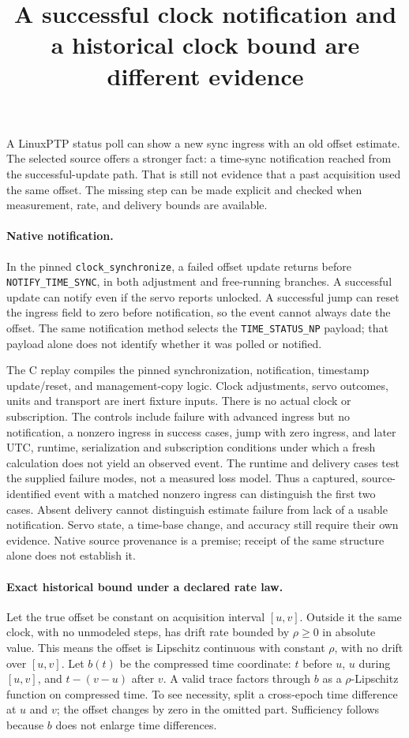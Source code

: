 \documentclass[11pt]{article}
\title{A successful clock notification and a historical clock bound are different evidence}
\begin{document}
\maketitle

A LinuxPTP status poll can show a new sync ingress with an old
offset estimate. The selected source offers a stronger fact:
a time-sync notification reached from the successful-update path.
That is still not evidence that a past acquisition used the same
offset. The missing step can be made explicit and checked when
measurement, rate, and delivery bounds are available.

\paragraph{Native notification.}
In the pinned \texttt{clock\_synchronize}, a failed offset update
returns before \texttt{NOTIFY\_TIME\_SYNC}, in both adjustment
and free-running branches. A successful update can notify even
if the servo reports unlocked. A successful jump can reset the
ingress field to zero before notification, so the event cannot
always date the offset. The same notification method selects
the \texttt{TIME\_STATUS\_NP} payload; that payload alone does
not identify whether it was polled or notified.

The C replay compiles the pinned synchronization, notification,
timestamp update/reset, and management-copy logic. Clock adjustments,
servo outcomes, units and transport are inert fixture inputs.
There is no actual clock or subscription. The controls include
failure with advanced ingress but no notification, a nonzero
ingress in success cases, jump with zero ingress, and later UTC,
runtime, serialization and subscription conditions under which
a fresh calculation does not yield an observed event. The
runtime and delivery cases test the supplied failure modes, not
a measured loss model. Thus a captured, source-identified event
with a matched nonzero ingress can distinguish the first two
cases. Absent delivery cannot distinguish estimate failure from
lack of a usable notification. Servo state, a time-base change,
and accuracy still require their own evidence. Native source
provenance is a premise; receipt of the same structure alone
does not establish it.

\paragraph{Exact historical bound under a declared rate law.}
Let the true offset be constant on acquisition interval \([u,v]\).
Outside it the same clock, with no unmodeled steps, has drift rate
bounded by \(\rho\ge0\) in absolute value. This means the offset
is Lipschitz continuous with constant \(\rho\), with no drift over
\([u,v]\). Let \(b(t)\) be the compressed time coordinate: \(t\)
before \(u\), \(u\) during \([u,v]\), and \(t-(v-u)\) after \(v\).
A valid trace factors through \(b\) as a \(\rho\)-Lipschitz
function on compressed time. To see necessity, split a
cross-epoch time difference at \(u\) and \(v\); the offset
changes by zero in the omitted part. Sufficiency follows because
\(b\) does not enlarge time differences.
\end{document}
